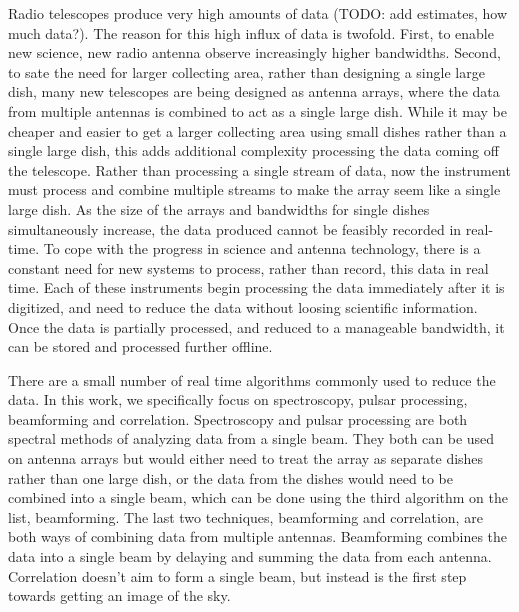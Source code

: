 Radio telescopes produce very high amounts of data (TODO: add estimates, how much data?). 
The reason for this high influx of data is twofold. 
First, to enable new science, new radio antenna observe increasingly higher bandwidths. 
Second, to sate the need for larger collecting area, rather than designing a single large dish, many new telescopes are being designed as antenna arrays, where the data from multiple antennas is combined to act as a single large dish.
While it may be cheaper and easier to get a larger collecting area using small dishes rather than a single large dish, this adds additional complexity processing the data coming off the telescope.
Rather than processing a single stream of data, now the instrument must process and combine multiple streams to make the array seem like a single large dish.
As the size of the arrays and bandwidths for single dishes simultaneously increase, the data produced cannot be feasibly recorded in real-time. 
To cope with the progress in science and antenna technology, there is a constant need for new systems to process, rather than record, this data in real time.
Each of these instruments begin processing the data immediately after it is digitized, and need to reduce the data without loosing scientific information.
Once the data is partially processed, and reduced to a manageable bandwidth, it can be stored and processed further offline.


There are a small number of real time algorithms commonly used to reduce the data. 
In this work, we specifically focus on spectroscopy, pulsar processing, beamforming and correlation. 
Spectroscopy and pulsar processing are both spectral methods of analyzing data from a single beam.
They both can be used on antenna arrays but would either need to treat the array as separate dishes rather than one large dish, or the data from the dishes would need to be combined into a single beam, which can be done using the third algorithm on the list, beamforming. 
The last two techniques, beamforming and correlation, are both ways of combining data from multiple antennas. 
Beamforming combines the data into a single beam by delaying and summing the data from each antenna.
Correlation doesn't aim to form a single beam, but instead is the first step towards getting an image of the sky. 



